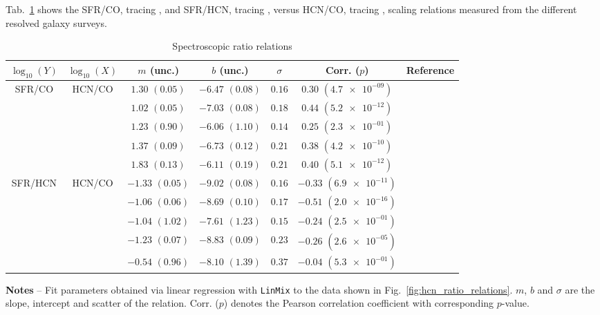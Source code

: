 \documentclass[letter, longauth]{aa} %
\begin{document}
\begin{appendix}
Tab.~\ref{tab:fdense} shows the SFR/CO, tracing \sfemol, and SFR/HCN, tracing \sfedense, versus HCN/CO, tracing \fdense, scaling relations measured from the different resolved galaxy surveys.

\begin{table}
\begin{center}
\caption{Spectroscopic ratio relations}
\label{tab:fdense}
\begin{tabular}{ccccccc}
    \hline \hline
    $\log_{10}(Y)$ & $\log_{10}(X)$ & $m$ (unc.) & $b$ (unc.) & $\sigma$ & Corr. ($p$) & Reference  \\
    \hline
    \multirow{5}{*}{SFR/CO} & \multirow{5}{*}{HCN/CO} & $1.30$ $(0.05)$ & $-6.47$ $(0.08)$ & $0.16$ & $0.30$ $(\num{4.7e-09})$ & \cite{Jimenez-Donaire2019} \\ 
    &  & $1.02$ $(0.05)$ & $-7.03$ $(0.08)$ & $0.18$ & $0.44$ $(\num{5.2e-12})$ & \cite{Neumann2023a} \\ 
    &  & $1.23$ $(0.90)$ & $-6.06$ $(1.10)$ & $0.14$ & $0.25$ $(\num{2.3e-01})$ & \cite{Kepley2014} \\ 
    &  & $1.37$ $(0.09)$ & $-6.73$ $(0.12)$ & $0.21$ & $0.38$ $(\num{4.2e-10})$ & \cite{Querejeta2019} \\
    &  & $1.83$ $(0.13)$ & $-6.11$ $(0.19)$ & $0.21$ & $0.40$ $(\num{5.1e-12})$ & \cite{Neumann2024} \\ 
    \hline
    \multirow{5}{*}{SFR/HCN} & \multirow{5}{*}{HCN/CO} & $-1.33$ $(0.05)$ & $-9.02$ $(0.08)$ & $0.16$ & $-0.33$ $(\num{6.9e-11})$ & \cite{Jimenez-Donaire2019} \\
    &  & $-1.06$ $(0.06)$ & $-8.69$ $(0.10)$ & $0.17$ & $-0.51$ $(\num{2.0e-16})$ & \cite{Neumann2023a} \\ 
    &  & $-1.04$ $(1.02)$ & $-7.61$ $(1.23)$ & $0.15$ & $-0.24$ $(\num{2.5e-01})$ & \cite{Kepley2014} \\ 
    &  & $-1.23$ $(0.07)$ & $-8.83$ $(0.09)$ & $0.23$ & $-0.26$ $(\num{2.6e-05})$ & \cite{Querejeta2019} \\ 
    &  & $-0.54$ $(0.96)$ & $-8.10$ $(1.39)$ & $0.37$ & $-0.04$ $(\num{5.3e-01})$ & \cite{Neumann2024} \\
    \hline\hline
\end{tabular}
\end{center}
\footnotesize{
\textbf{Notes} --
Fit parameters obtained via linear regression with \texttt{LinMix} to the data shown in Fig.~\ref{fig:hcn_ratio_relations}. 
$m$, $b$ and $\sigma$ are the slope, intercept and scatter of the relation.
Corr. ($p$) denotes the Pearson correlation coefficient with corresponding $p$-value.
}
\end{table}





\end{appendix}
\end{document}
